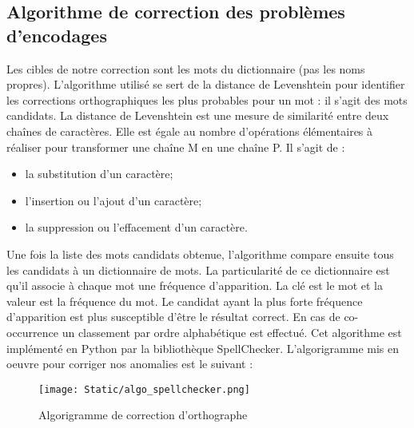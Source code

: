 \subsection{Algorithme de correction des probl\`emes d'encodages}
Les cibles de notre correction sont les mots du dictionnaire (pas les noms propres). L'algorithme utilis\'e se sert de la distance de Levenshtein pour identifier les corrections orthographiques les plus probables pour un mot : il s'agit des mots candidats. La distance de Levenshtein est une mesure de similarit\'e entre deux chaînes de caract\`eres. Elle est \'egale au nombre d'op\'erations \'el\'ementaires \`a r\'ealiser  pour transformer une chaîne M en une chaîne P. Il s'agit de :
\begin{itemize}[parsep=0cm,itemsep=0cm]
\item la substitution d'un caract\`ere;
\item l'insertion  ou l'ajout d'un caract\`ere;
\item la suppression ou l'effacement d'un caract\`ere.
\end{itemize}
Une fois la liste des mots candidats obtenue, l'algorithme compare ensuite tous les candidats à un dictionnaire de mots. La particularit\'e de ce dictionnaire est qu'il associe \`a chaque mot une fr\'equence d'apparition. La cl\'e est le mot et la valeur est la fr\'equence du mot. Le candidat ayant la plus forte fr\'equence d'apparition est plus susceptible d'être le résultat correct. En cas de co-occurrence un classement par ordre alphab\'etique est effectu\'e. Cet algorithme est impl\'ement\'e en Python par la biblioth\`eque SpellChecker. L'algorigramme mis en oeuvre pour corriger nos anomalies est le suivant : 
\begin{figure}[H]
    \begin{center}
      \texttt{[image: Static/algo\_spellchecker.png]} 
      \end{center}
        \caption{Algorigramme de correction d'orthographe}  \label{fig:xray}
\end{figure}

